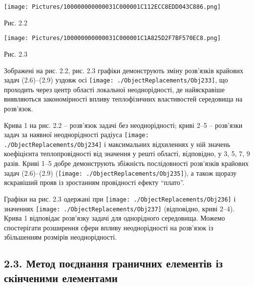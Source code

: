 \texttt{[image: Pictures/100000000000031C000001C112ECC8EDD043C886.png]}

Рис. 2.2

\texttt{[image: Pictures/100000000000031C000001C1A825D2F7BF570EC8.png]}

Рис. 2.3

Зображені на рис. 2.2, рис. 2.3 графіки демонструють зміну розв'язків
крайових задач (2.6)--(2.9) уздовж осі
\texttt{[image: ./ObjectReplacements/Obj233]},
що проходить через центр області локальної неоднорідності, де
найяскравіше виявляються закономірності впливу теплофізичних
властивостей середовища на розв'язок.

Крива 1 на рис. 2.2 -- розв'язок задачі без неоднорідності; криві 2--5
-- розв'язки задач за наявної неоднорідності радіуса
\texttt{[image: ./ObjectReplacements/Obj234]}
і максимальних відхиленнях у ній значень коефіцієнта теплопровідності
від значення у решті області, відповідно, у 3, 5, 7, 9 разів. Криві 1--5
добре демонструють збіжність послідовності розв'язків крайових задач
(2.6)--(2.9)
(\texttt{[image: ./ObjectReplacements/Obj235]}),
а також щоразу яскравіший прояв із зростанням провідності ефекту
``плато''.

Графіки на рис. 2.3 одержані при
\texttt{[image: ./ObjectReplacements/Obj236]}
і значеннях
\texttt{[image: ./ObjectReplacements/Obj237]}
(відповідно, криві 2--4). Крива 1 відповідає розв'язку задачі для
однорідного середовища. Можемо спостерігати розширення сфери впливу
неоднорідності на розв'язок із збільшенням розмірів неоднорідності.

\hypertarget{ux43cux435ux442ux43eux434-ux43fux43eux454ux434ux43dux430ux43dux43dux44f-ux433ux440ux430ux43dux438ux447ux43dux438ux445-ux435ux43bux435ux43cux435ux43dux442ux456ux432-ux456ux437-ux441ux43aux456ux43dux447ux435ux43dux438ux43cux438-ux435ux43bux435ux43cux435ux43dux442ux430ux43cux438}{%
\subsection[2.3. Метод поєднання граничних елементів із скінченими
елементами]{\texorpdfstring{\protect\hypertarget{anchor-35}{}{}2.3.
Метод поєднання граничних елементів із скінченими
елементами}{2.3. Метод поєднання граничних елементів із скінченими елементами}}\label{ux43cux435ux442ux43eux434-ux43fux43eux454ux434ux43dux430ux43dux43dux44f-ux433ux440ux430ux43dux438ux447ux43dux438ux445-ux435ux43bux435ux43cux435ux43dux442ux456ux432-ux456ux437-ux441ux43aux456ux43dux447ux435ux43dux438ux43cux438-ux435ux43bux435ux43cux435ux43dux442ux430ux43cux438}}


